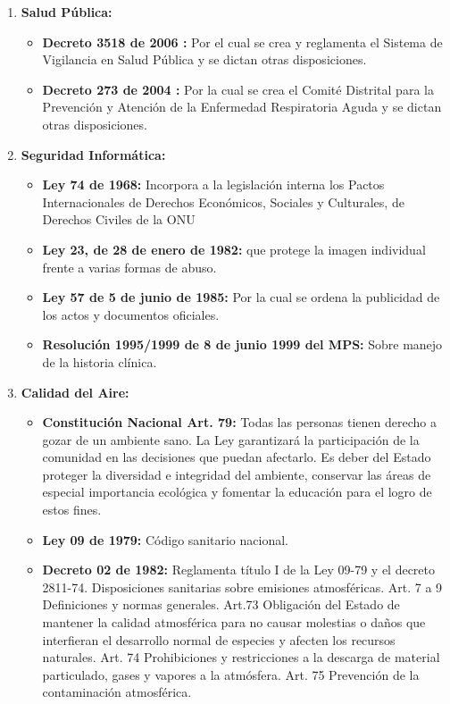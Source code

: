 \documentclass[a4paper, 11pt, oneside]{article}
\theoremstyle{definition}
\theoremstyle{remark}
\begin{document}
\begin{enumerate}[I]%
\item\textbf{Salud Pública:}
	\begin{itemize}
    \item\textbf{Decreto 3518 de 2006 :} Por el cual se crea y reglamenta el 		Sistema de Vigilancia en Salud Pública y se dictan otras disposiciones.
	\item\textbf{Decreto 273 de 2004 :} Por la cual se crea el Comité Distrital 	para la Prevención y Atención de la Enfermedad Respiratoria Aguda y se dictan 	  otras disposiciones.
	\end{itemize}
\item\textbf{Seguridad Informática:}
	\begin{itemize}
    \item\textbf{Ley 74 de 1968: }  Incorpora a la legislación interna los Pactos 	  Internacionales de Derechos Económicos, Sociales y Culturales, de Derechos 	 Civiles de la ONU  
	\item\textbf{Ley 23, de 28 de enero de 1982: }que protege la imagen 		     individual frente a varias formas de abuso.
    \item\textbf{Ley 57 de 5 de junio de 1985: } Por la cual se ordena la 			publicidad de los actos y documentos oficiales.
    \item\textbf{Resolución 1995/1999 de 8 de junio 1999 del MPS: } Sobre manejo 	 de la historia clínica.
	\end{itemize}
\item\textbf{Calidad del Aire:}
	\begin{itemize}
    \item\textbf{Constitución Nacional Art. 79: }  Todas las personas tienen 		derecho a gozar de un ambiente sano. La Ley garantizará la participación de 	la comunidad en las decisiones que puedan afectarlo. Es deber del Estado 		proteger la diversidad e integridad del ambiente, conservar las áreas de 		especial importancia ecológica y fomentar la educación para el logro de estos 	  fines.
	\item\textbf{Ley 09 de 1979: }Código sanitario nacional.
    \item\textbf{Decreto 02 de 1982: } Reglamenta título I de la Ley 09-79 y el        decreto 2811-74. Disposiciones sanitarias sobre emisiones atmosféricas. Art. 	7 a 9 Definiciones y normas generales. Art.73 Obligación del Estado de 			mantener la calidad atmosférica para no causar molestias o daños que 			interfieran el desarrollo normal de especies y afecten los recursos 			naturales. Art. 74 Prohibiciones y restricciones a la descarga de material 		particulado, gases y vapores a la atmósfera. Art. 75 Prevención de la 			contaminación atmosférica.

\end{itemize}
\end{enumerate}
\end{document}
